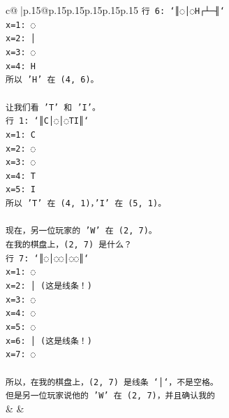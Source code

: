 \documentclass{article}
\begin{document}
{\begin{supertabular}{c@{$\;$}|p{.15\linewidth}@{}p{.15\linewidth}p{.15\linewidth}p{.15\linewidth}p{.15\linewidth}p{.15\linewidth}}
{{{\texttt{行 6: `║◌│◌H┌┴─╢`} \\
\texttt{x=1: ◌} \\
\texttt{x=2: │} \\
\texttt{x=3: ◌} \\
\texttt{x=4: H} \\
\texttt{所以 'H' 在 (4, 6)。} \\
\\ 
\texttt{让我们看 'T' 和 'I'。} \\
\texttt{行 1: `║C│◌│◌TI║`} \\
\texttt{x=1: C} \\
\texttt{x=2: ◌} \\
\texttt{x=3: ◌} \\
\texttt{x=4: T} \\
\texttt{x=5: I} \\
\texttt{所以 'T' 在 (4, 1)，'I' 在 (5, 1)。} \\
\\ 
\texttt{现在，另一位玩家的 'W' 在 (2, 7)。} \\
\texttt{在我的棋盘上，(2, 7) 是什么？} \\
\texttt{行 7: `║◌│◌◌│◌◌║`} \\
\texttt{x=1: ◌} \\
\texttt{x=2: │ (这是线条！)} \\
\texttt{x=3: ◌} \\
\texttt{x=4: ◌} \\
\texttt{x=5: ◌} \\
\texttt{x=6: │ (这是线条！)} \\
\texttt{x=7: ◌} \\
\\ 
\texttt{所以，在我的棋盘上，(2, 7) 是线条 `│`，不是空格。} \\
\texttt{但是另一位玩家说他的 'W' 在 (2, 7)，并且确认我的} \\
            }
        }
    }
    & & \\ \\


\end{supertabular}}
\end{document}

